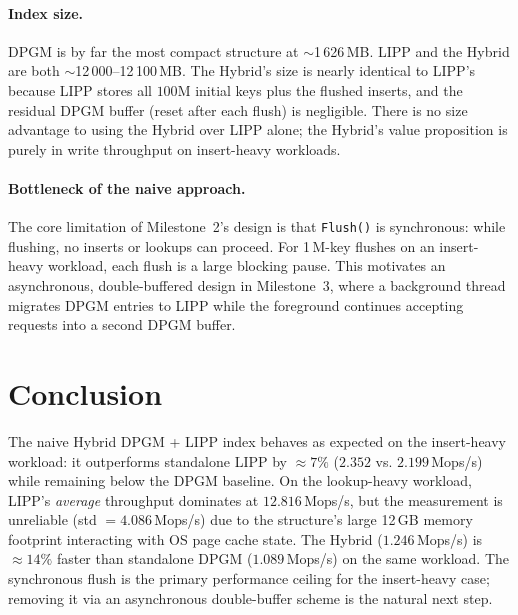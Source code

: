 \documentclass{MITcsail}
\begin{document}
\paragraph{Index size.}
DPGM is by far the most compact structure at $\sim$1\,626\,MB.  LIPP and
the Hybrid are both $\sim$12\,000--12\,100\,MB.  The Hybrid's size is
nearly identical to LIPP's because LIPP stores all $100\text{M}$ initial
keys plus the flushed inserts, and the residual DPGM buffer (reset after
each flush) is negligible.  There is no size advantage to using the Hybrid
over LIPP alone; the Hybrid's value proposition is purely in write
throughput on insert-heavy workloads.

\paragraph{Bottleneck of the naive approach.}
The core limitation of Milestone~2's design is that \texttt{Flush()} is
synchronous: while flushing, no inserts or lookups can proceed.  For
1\,M-key flushes on an insert-heavy workload, each flush is a large
blocking pause.  This motivates an asynchronous, double-buffered design
in Milestone~3, where a background thread migrates DPGM entries to LIPP
while the foreground continues accepting requests into a second DPGM buffer.

\section{Conclusion}
The naive Hybrid DPGM + LIPP index behaves as expected on the insert-heavy
workload: it outperforms standalone LIPP by $\approx 7\%$ ($2.352$ vs.
$2.199$\,Mops/s) while remaining below the DPGM baseline.  On the
lookup-heavy workload, LIPP's \emph{average} throughput dominates at
$12.816$\,Mops/s, but the measurement is unreliable (std $= 4.086$\,Mops/s)
due to the structure's large 12\,GB memory footprint interacting with OS page
cache state.  The Hybrid ($1.246$\,Mops/s) is $\approx 14\%$ faster than
standalone DPGM ($1.089$\,Mops/s) on the same workload.  The synchronous flush
is the primary performance ceiling for the insert-heavy case; removing it via
an asynchronous double-buffer scheme is the natural next step.
\end{document}
